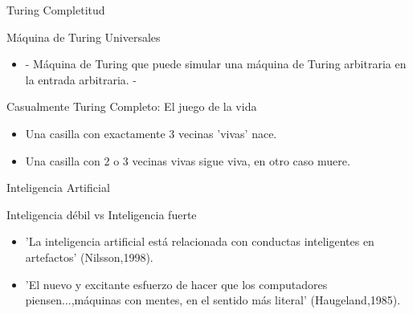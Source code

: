 \begin{frame}[fragile]{Turing Completitud }

\begin{block}{Máquina de Turing Universales}
	\begin{itemize}
		\pause
		\item -   Máquina de Turing que puede simular una máquina de Turing arbitraria en la entrada arbitraria. -
	\end{itemize}


\end{block}
\pause
\begin{block}{Casualmente Turing Completo: El juego de la vida }

	\begin{itemize}
		\item Una casilla con exactamente 3 vecinas 'vivas' nace.
		\item Una casilla con 2 o 3 vecinas vivas sigue viva, en otro caso muere.
	\end{itemize}
	
\end{block}

\end{frame}

\begin{frame}[fragile]{Inteligencia Artificial }

\begin{block}{Inteligencia débil vs Inteligencia fuerte }
	
	\begin{itemize}
		\item 'La inteligencia artificial está relacionada con conductas inteligentes en artefactos' (Nilsson,1998).
		\pause
		\item 'El nuevo y excitante esfuerzo de hacer que los computadores piensen...,máquinas con mentes, en el sentido más literal' (Haugeland,1985).
	\end{itemize}
	
\end{block}

\end{frame}

